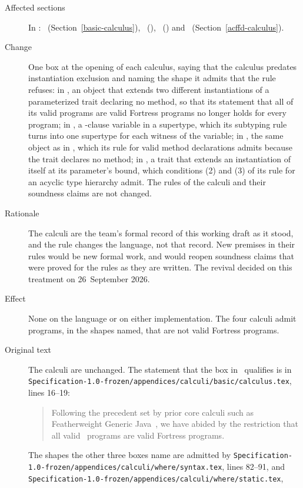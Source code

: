 \begin{description}
\item[Affected sections] In : \basiccore\
(Section~\ref{basic-calculus}), \wherecore\ (),
\overloadingcore\ (\appref{overloading-calculus}) and \acffdcore\
(Section~\ref{acffd-calculus}).
\item[Change] One box at the opening of each calculus, saying that the
calculus predates instantiation exclusion and naming the shape it admits
that the rule refuses: in \basiccore, an object that extends two different
instantiations of a parameterized trait declaring no method, so that its
statement that all of its valid programs are valid Fortress programs no
longer holds for every program; in \wherecore, a \KWD{where}-clause
variable in a supertype, which its subtyping rule turns into one supertype
for each witness of the variable; in \overloadingcore, the same object as
in \basiccore, which its rule for valid method declarations admits because
the trait declares no method; in \acffdcore, a trait that extends an
instantiation of itself at its parameter's bound, which conditions (2)
and (3) of its rule for an acyclic type hierarchy admit.
The rules of the calculi and their soundness claims are not changed.
\item[Rationale] The calculi are the team's formal record of this working
draft as it stood, and the rule changes the language, not that record.
New premises in their rules would be new formal work, and would reopen
soundness claims that were proved for the rules as they are written.
The revival decided on this treatment on 26~September 2026.
\item[Effect] None on the language or on either implementation.
The four calculi admit programs, in the shapes named, that are not valid
Fortress programs.
\item[Original text] The calculi are unchanged. The statement that the box
in \basiccore\ qualifies is in
\nolinkurl{Specification-1.0-frozen/appendices/calculi/basic/calculus.tex},
lines 16--19:
\begin{quote}
Following the precedent set by prior core calculi such as Featherweight
Generic Java~\cite{fgj},
we have abided by the restriction that all valid \basiccore\ programs are
valid Fortress programs.
\end{quote}
The shapes the other three boxes name are admitted by
\nolinkurl{Specification-1.0-frozen/appendices/calculi/where/syntax.tex},
lines 82--91, and
\nolinkurl{Specification-1.0-frozen/appendices/calculi/where/static.tex},

\end{description}
